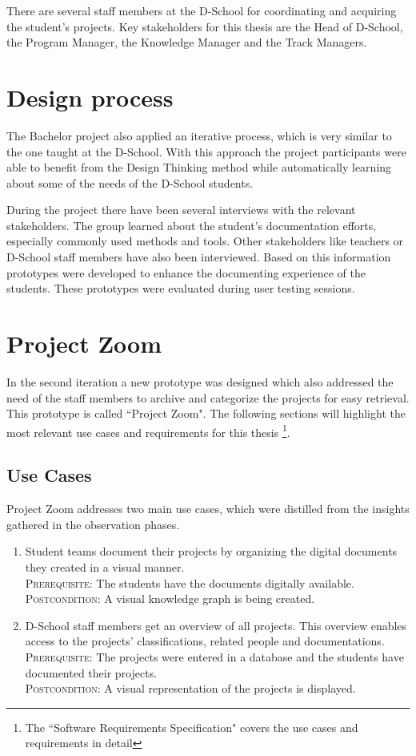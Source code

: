 There are several staff members at the D-School for coordinating and acquiring the student's projects. Key stakeholders for this thesis are the Head of D-School, the Program Manager, the Knowledge Manager and the Track Managers.

\section{Design process}
The Bachelor project also applied an iterative process, which is very similar to the one taught at the D-School. With this approach the project participants were able to benefit from the Design Thinking method while automatically learning about some of the needs of the D-School students.

During the project there have been several interviews with the relevant stakeholders. The group learned about the student's documentation efforts, especially commonly used methods and tools. Other stakeholders like teachers or D-School staff members have also been interviewed. Based on this information prototypes were developed to enhance the documenting experience of the students. These prototypes were evaluated during user testing sessions.

\section{Project Zoom}
In the second iteration a new prototype was designed which also addressed the need of the staff members to archive and categorize the projects for easy retrieval. This prototype is called ``Project Zoom". The following sections will highlight the most relevant use cases and requirements for this thesis \footnote{The ``Software Requirements Specification"\cite{ReqSpec} covers the use cases and requirements in detail}.

\subsection{Use Cases}
Project Zoom addresses two main use cases, which were distilled from the insights gathered in the observation phases.

\begin{enumerate}
\item Student teams document their projects by organizing the digital documents they created in a visual manner.\\
\textsc{Prerequisite}: The students have the documents digitally available.\\
\textsc{Postcondition}: A visual knowledge graph is being created. \label{uc:1}

\item D-School staff members get an overview of all projects. This overview enables access to the projects' classifications, related people and documentations.\\
\textsc{Prerequisite}: The projects were entered in a database and the students have documented their projects.\\
\textsc{Postcondition}: A visual representation of the projects is displayed. \label{uc:2}
\end{enumerate}

